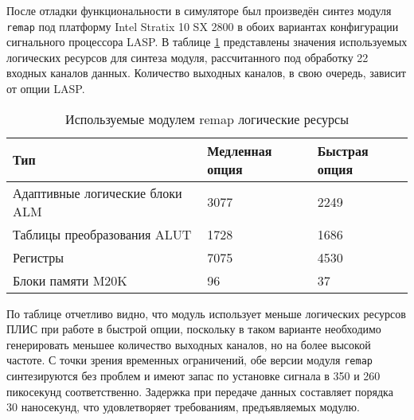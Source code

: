 После отладки функциональности в симуляторе был произведён синтез модуля \texttt{remap} под платформу Intel Stratix 10 SX 2800 в обоих вариантах конфигурации сигнального процессора LASP. В таблице \ref{tab:remap_util} представлены значения используемых логических ресурсов для синтеза модуля, рассчитанного под обработку 22 входных каналов данных. Количество выходных каналов, в свою очередь, зависит от опции LASP.\par
\begin{table}[ht]
    \caption{Используемые модулем remap логические ресурсы}
    \begin{tabular}{|p{}|p{}|p{}|}
        \hline
        Тип & Медленная опция & Быстрая опция \\
        \hline
        Адаптивные логические блоки ALM & 3077 & 2249 \\
        \hline
        Таблицы преобразования ALUT & 1728 & 1686 \\
        \hline
        Регистры & 7075 & 4530 \\
        \hline
        Блоки памяти M20K & 96 & 37 \\
        \hline
    \end{tabular}
    \label{tab:remap_util}
\end{table}
По таблице отчетливо видно, что модуль использует меньше логических ресурсов ПЛИС при работе в быстрой опции, поскольку в таком варианте необходимо генерировать меньшее количество выходных каналов, но на более высокой частоте. С точки зрения временных ограничений, обе версии модуля \texttt{remap} синтезируются без проблем и имеют запас по установке сигнала в 350 и 260 пикосекунд соответственно. Задержка при передаче данных составляет порядка 30 наносекунд, что удовлетворяет требованиям, предъявляемых модулю.\par

